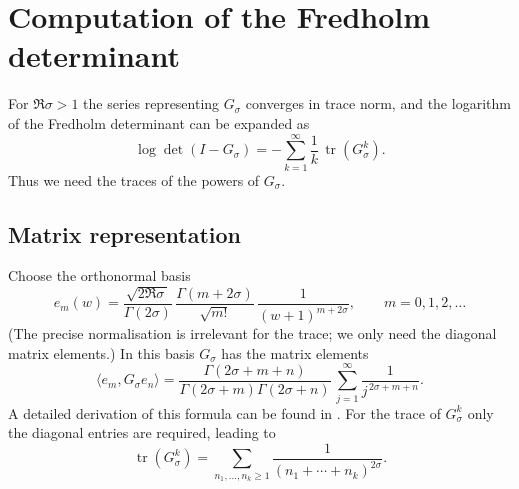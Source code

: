 \documentclass{article}
\theoremstyle{definition}
\theoremstyle{remark}
\DeclareMathOperator{\tr}{tr}
\DeclareMathOperator{\Det}{\det}
\begin{document}
\section{Computation of the Fredholm determinant}

For \(\Re\sigma>1\) the series representing \(G_{\sigma}\) converges in
trace norm, and the logarithm of the Fredholm determinant can be
expanded as
\[
\log\Det(I-G_{\sigma})= -\sum_{k=1}^{\infty}\frac{1}{k}\,\tr(G_{\sigma}^{k}).
\]
Thus we need the traces of the powers of \(G_{\sigma}\).

\subsection{Matrix representation}
Choose the orthonormal basis
\[
e_{m}(w)=\frac{\sqrt{2\Re\sigma\,}}{\Gamma(2\sigma)}\,
\frac{\Gamma(m+2\sigma)}{\sqrt{m!}}\,
\frac{1}{(w+1)^{m+2\sigma}},\qquad m=0,1,2,\dots
\]
(The precise normalisation is irrelevant for the trace; we only need the
diagonal matrix elements.)  In this basis \(G_{\sigma}\) has the
matrix elements
\[
\langle e_{m}, G_{\sigma}e_{n}\rangle =
\frac{\Gamma(2\sigma+m+n)}{\Gamma(2\sigma+m)\Gamma(2\sigma+n)}\,
\sum_{j=1}^{\infty}\frac{1}{j^{\,2\sigma+m+n}} .
\]
A detailed derivation of this formula can be found in
\cite{Mayer91,Efrat93}.  For the trace of \(G_{\sigma}^{k}\) only
the diagonal entries are required, leading to
\begin{equation}\label{eq:trace}
\tr(G_{\sigma}^{k}) = \sum_{n_{1},\dots,n_{k}\ge 1}
\frac{1}{(n_{1}+\cdots+n_{k})^{2\sigma}} .
\end{equation}
\end{document}

